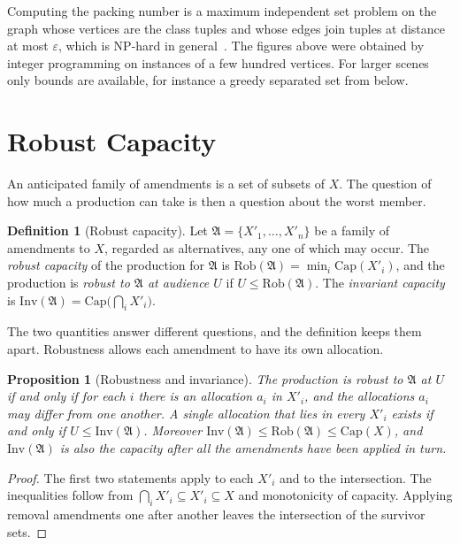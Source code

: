 \documentclass[11pt,twoside,openright]{book}
\theoremstyle{plain}
\newtheorem{proposition}[theorem]{Proposition}
\theoremstyle{definition}
\newtheorem{definition}[theorem]{Definition}
\theoremstyle{remark}
\newcommand{\Capac}{\mathrm{Cap}}
\newcommand{\Rob}{\mathrm{Rob}}
\newcommand{\Inv}{\mathrm{Inv}}
\begin{document}
Computing the packing number is a maximum independent set problem on the graph whose vertices are the class tuples and whose edges join tuples at distance at most $\varepsilon$, which is NP-hard in general~\cite{garey1979}. The figures above were obtained by integer programming on instances of a few hundred vertices. For larger scenes only bounds are available, for instance a greedy separated set from below.

\section{Robust Capacity}\label{sec:robust}

An anticipated family of amendments is a set of subsets of $X$. The question of how much a production can take is then a question about the worst member.

\begin{definition}[Robust capacity]\label{def:robust}
Let $\mathfrak A=\{X'_1,\dots,X'_n\}$ be a family of amendments to $X$, regarded as alternatives, any one of which may occur. The \emph{robust capacity} of the production for $\mathfrak A$ is $\Rob(\mathfrak A)=\min_i\Capac(X'_i)$, and the production is \emph{robust to $\mathfrak A$ at audience $U$} if $U\le\Rob(\mathfrak A)$. The \emph{invariant capacity} is $\Inv(\mathfrak A)=\Capac\bigl(\bigcap_iX'_i\bigr)$.
\end{definition}

The two quantities answer different questions, and the definition keeps them apart. Robustness allows each amendment to have its own allocation.

\begin{proposition}[Robustness and invariance]\label{prop:robinv}
The production is robust to $\mathfrak A$ at $U$ if and only if for each $i$ there is an allocation $a_i$ in $X'_i$, and the allocations $a_i$ may differ from one another. A single allocation that lies in every $X'_i$ exists if and only if $U\le\Inv(\mathfrak A)$. Moreover $\Inv(\mathfrak A)\le\Rob(\mathfrak A)\le\Capac(X)$, and $\Inv(\mathfrak A)$ is also the capacity after all the amendments have been applied in turn.
\end{proposition}

\begin{proof}
The first two statements apply  to each $X'_i$ and to the intersection. The inequalities follow from $\bigcap_iX'_i\subseteq X'_i\subseteq X$ and monotonicity of capacity. Applying removal amendments one after another leaves the intersection of the survivor sets.
\end{proof}
\end{document}
